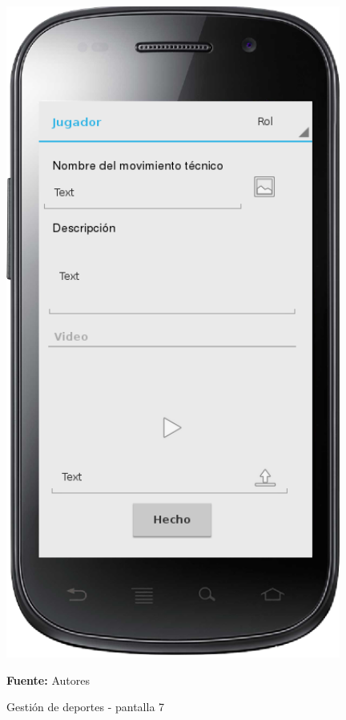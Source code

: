 \begin{figure}[!htb]
  \begin{center}
    \includegraphics[width=11cm]{./imagenes/UI/Deportes/gestion_deportes_7.png}
    \caption{Gestión de deportes - pantalla 7}
    \label{fig:gestion_deportes_7}
    \textbf{Fuente:}  Autores
  \end{center}
\end{figure}

